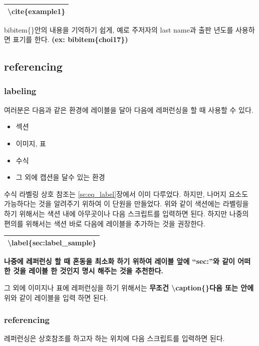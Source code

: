 \documentclass[12pt]{article}
\begin{document}
	\begin{tabularx}{\textwidth\onehalfspacing}{|X|}
		\hline
		\textbackslash cite\{example1\}\\
		\hline
	\end{tabularx}\newline\newline
	bibitem\{\}안의 내용을 기억하기 쉽게, 예로 주저자의 last name과 출판 년도를 사용하면 표기를 한다. \textbf{(ex: bibitem\{choi17\})}
	\clearpage
	\subsection{referencing}
	\subsubsection{labeling}
	여러분은 다음과 같은 환경에 레이블을 달아 다음에 레퍼런싱을 할 때 사용할 수 있다.
	\begin{itemize}
		\item 섹션
		\item 이미지, 표
		\item 수식
		\item 그 외에 캡션을 달수 있는 환경
	\end{itemize}
	수식 라벨링 상호 참조는 \ref{se:eq_label}장에서 이미 다루었다. 하지만, 나머지 요소도 가능하다는 것을 알려주기 위하여 이 단원을 만들었다.\newline
	위와 같이 색션에는 라벨링을 하기 위해서는 색션 내에 아무곳이나 다음 스크립트를 입력하면 된다. 하지만 나중의 편의를 위해서는 색션 바로 다음에 레이블을 추가하는 것을 권장한다.\newline
	
	\begin{tabularx}{\textwidth\onehalfspacing}{|X|}
		\hline
		\textbackslash label\{sec:label\_sample\}\\
		\hline
	\end{tabularx}\newline\newline
	\textbf{나중에 레퍼런싱 할 때 혼동을 최소화 하기 위하여 레이블 앞에 ``sec:''와 같이 어떠한 것을 레이블 한 것인지 명시 해주는 것을 추천한다.}
	
	그 외에 이미지나 표에 레퍼런싱을 하기 위해서는 \textbf{무조건 \textbackslash caption\{\}다음 또는 안에} 위와 같이 레이블을 입력 하면 된다.
	\subsubsection{referencing}
	레퍼런싱은 상호참조를 하고자 하는 위치에 다음 스크립트를 입력하면 된다.\newline
	
\end{document}
